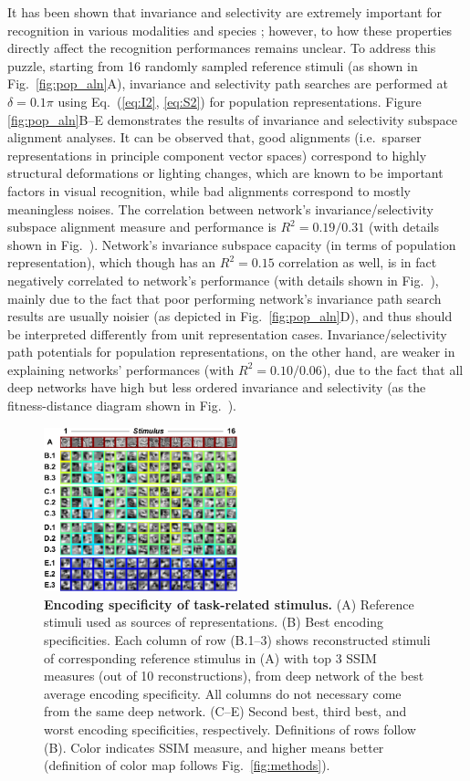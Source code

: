 It has been shown that invariance and selectivity are extremely important for recognition in various modalities and species \cite{desimone1991face, ito1995size, quiroga2005invariant}; however, to how these properties directly affect the recognition performances remains unclear. To address this puzzle, starting from 16 randomly sampled reference stimuli (as shown in Fig.~\ref{fig:pop_aln}A), invariance and selectivity path searches are performed at $\delta = 0.1\pi$ using Eq.~(\ref{eq:I2}, \ref{eq:S2}) for population representations. Figure \ref{fig:pop_aln}B--E demonstrates the results of invariance and selectivity subspace alignment analyses. It can be observed that, good alignments (i.e.~sparser representations in principle component vector spaces) correspond to highly structural deformations or lighting changes, which are known to be important factors in visual recognition, while bad alignments correspond to mostly meaningless noises. The correlation between network's invariance/selectivity subspace alignment measure and performance is $R^2=0.19/0.31$ (with details shown in Fig.~\SFaln{}). Network's invariance subspace capacity (in terms of population representation), which though has an $R^2=0.15$ correlation as well, is in fact negatively correlated to network's performance (with details shown in Fig.~\SFinc{}), mainly due to the fact that poor performing network's invariance path search results are usually noisier (as depicted in Fig.~\ref{fig:pop_aln}D), and thus should be interpreted differently from unit representation cases. Invariance/selectivity path potentials for population representations, on the other hand, are weaker in explaining networks' performances (with $R^2=0.10/0.06$), due to the fact that all deep networks have high but less ordered invariance and selectivity (as the fitness-distance diagram shown in Fig.~\SFfda{}).

\begin{figure}
\centering \includegraphics[width=0.5\textwidth]{Figs/pic4.pdf}
\caption{
{\bf Encoding specificity of task-related stimulus.} (A) Reference stimuli used as sources of representations. (B) Best encoding specificities. Each column of row (B.1--3) shows reconstructed stimuli of corresponding reference stimulus in (A) with top 3 SSIM measures (out of 10 reconstructions), from deep network of the best average encoding specificity. All columns do not necessary come from the same deep network. (C--E) Second best, third best, and worst encoding specificities, respectively. Definitions of rows follow (B). Color indicates SSIM measure, and higher means better (definition of color map follows Fig.~\ref{fig:methods}).}
\label{fig:pop_ens}
\end{figure}

